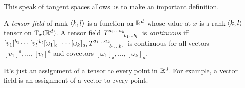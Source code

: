 This speak of tangent spaces allows us to make an important definition.
\begin{dfn}\label{TensorField}
A \emph{tensor field} of rank $\coord{k,l}$ is a function on $\R ^d$ whose value at $x$ is a rank $\coord{k,l}$ tensor on $\tangent{\R ^d}{x}$.  A tensor field $T\indices{^{a_1\ldots a_k}_{b_1\ldots b_l}}$ is \emph{continuous} iff $[v_1]^{b_1}\cdots [v_l]^{b_l}[\omega _1]_{a_1}\cdots [\omega _k]_{a_k}T\indices{^{a_1\ldots a_k}_{b_1\ldots b_l}}$ is continuous for all vectors $[v_1]^a,\ldots ,[v_l]^a$ and covectors $[\omega _1]_a,\ldots ,[\omega _k]_a$.
\begin{rmk}
It's just an assignment of a tensor to every point in $\R ^d$.  For example, a vector field is an assignment of a vector to every point.
\end{rmk}
\end{dfn}

